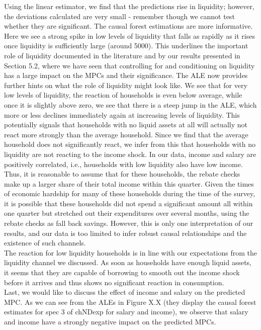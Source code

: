 Using the linear estimator, we find that the predictions rise in liquidity; however, the deviations calculated are very small - remember though we cannot test whether they are significant. The causal forest estimations are more informative. Here we see a strong spike in low levels of liquidity that falls as rapidly as it rises once liquidity is sufficiently large (around 5000). This underlines the important role of liquidity documented in the literature and by our results presented in Section 5.2, where we have seen that controlling for and conditioning on liquidity has a large impact on the MPCs and their significance. The ALE now provides further hints on what the role of liquidity might look like. We see that for very low levels of liquidity, the reaction of households is even below average, while once it is slightly above zero, we see that there is a steep jump in the ALE, which more or less declines immediately again at increasing levels of liquidity. This potentially signals that households with no liquid assets at all will actually not react more strongly than the average household. Since we find that the average household does not significantly react, we infer from this that households with no liquidity are not reacting to the income shock. In our data, income and salary are positively correlated, i.e., households with low liquidity also have low income. Thus, it is reasonable to assume that for these households, the rebate checks make up a larger share of their total income within this quarter. Given the times of economic hardship for many of these households during the time of the survey, it is possible that these households did not spend a significant amount all within one quarter but stretched out their expenditures over several months, using the rebate checks as fall back savings. However, this is only one interpretation of our results, and our data is too limited to infer robust causal relationships and the existence of such channels. \\
The reaction for low liquidity households is in line with our expectations from the liquidity channel we discussed. As soon as households have enough liquid assets, it seems that they are capable of borrowing to smooth out the income shock before it arrives and thus shows no significant reaction in consumption. \\
Last, we would like to discuss the effect of income and salary on the predicted MPC. As we can see from the ALEs in Figure X.X (they display the causal forest estimates for spec 3 of chNDexp for salary and income), we observe that salary and income have a strongly negative impact on the predicted MPCs. 


